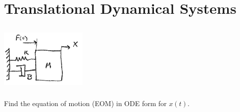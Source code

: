 \documentclass{article}	%
\begin{document}
%
%
%
%
%
%
%
%
%
%
\newpage
\section{Translational Dynamical Systems}

\subsection{}

\includegraphics[width=42mm]{00449a.png}

\subsubsection{} Find the equation of motion (EOM) in ODE form for $x(t)$.

%
%
\end{document}
